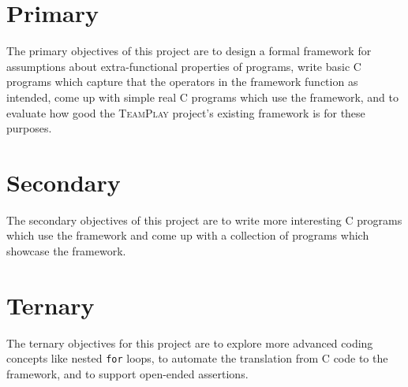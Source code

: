 \section{Primary}
    The primary objectives of this project are to design a formal framework for assumptions about extra-functional properties of programs, write basic C programs which capture that the operators in the framework function as intended, come up with simple real C programs which use the framework, and to evaluate how good the \textsc{TeamPlay} project's existing framework is for these purposes.


\section{Secondary}
    The secondary objectives of this project are to write more interesting C programs which use the framework and come up with a collection of programs which showcase the framework.


\section{Ternary}
    The ternary objectives for this project are to explore more advanced coding concepts like nested \texttt{for} loops, to automate the translation from C code to the framework, and to support open-ended assertions.

